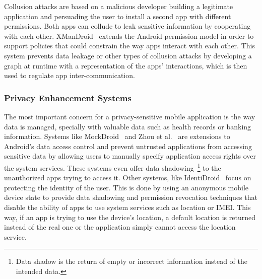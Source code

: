 Collusion attacks are based on a malicious developer building a legitimate application and persuading the user to install a second app with different permissions. Both apps can collude to leak sensitive information by cooperating with each other. XManDroid~\cite{bugiel2011xmandroid} extends the Android permission model in order to support policies that could constrain the way apps interact with each other. This system prevents data leakage or other types of collusion attacks by developing a graph at runtime with a representation of the apps’ interactions, which is then used to regulate app inter-communication.

\subsubsection{Privacy Enhancement Systems}


The most important concern for a privacy-sensitive mobile application is the way data is managed, specially with valuable data such as health records or banking information. Systems like MockDroid~\cite{beresford2011mockdroid} and Zhou et al.~\cite{zhou2011taming} are extensions to Android's data access control and prevent untrusted applications from accessing sensitive data by allowing users to manually specify application access rights over the system services.
These systems even offer data shadowing~\footnote{Data shadow is the return of empty or incorrect information instead of the intended data.} to the unauthorized apps trying to access it.
Other systems, like IdentiDroid~\cite{shebaro2014identidroid} focus on protecting the identity of the user. This is done by using an anonymous mobile device state to provide data shadowing and permission revocation techniques that disable the ability of apps to use system services such as location or \ac{IMEI}. This way, if an app is trying to use the device's location, a default location is returned instead of the real one or the application simply cannot access the location service.

